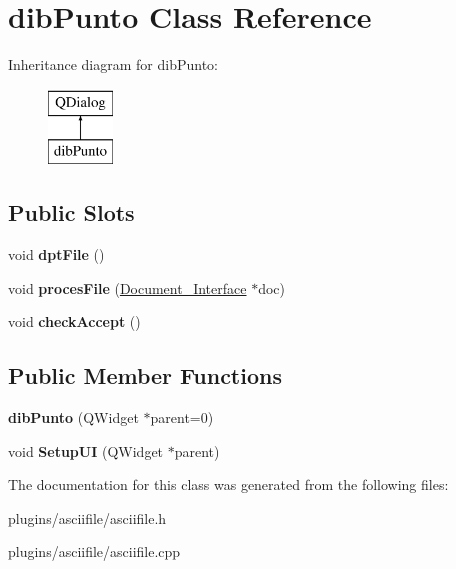 \hypertarget{classdibPunto}{\section{dib\-Punto Class Reference}
\label{classdibPunto}
}
Inheritance diagram for dib\-Punto\-:\begin{figure}[H]
\begin{center}
\leavevmode
\includegraphics[height=2.000000cm]{classdibPunto}
\end{center}
\end{figure}
\subsection*{Public Slots}
\begin{DoxyCompactItemize}
\item 
\hypertarget{classdibPunto_a6e71489566f40594877a9288651f0355}{void {\bfseries dpt\-File} ()}\label{classdibPunto_a6e71489566f40594877a9288651f0355}

\item 
\hypertarget{classdibPunto_a60b9d8212ec6cda0a5d0638f9c05ff74}{void {\bfseries proces\-File} (\hyperlink{classDocument__Interface}{Document\-\_\-\-Interface} $\ast$doc)}\label{classdibPunto_a60b9d8212ec6cda0a5d0638f9c05ff74}

\item 
\hypertarget{classdibPunto_a21f1670a1191b4a66c1383f6a97f72e4}{void {\bfseries check\-Accept} ()}\label{classdibPunto_a21f1670a1191b4a66c1383f6a97f72e4}

\end{DoxyCompactItemize}
\subsection*{Public Member Functions}
\begin{DoxyCompactItemize}
\item 
\hypertarget{classdibPunto_a5fe19976de37929b8c361ccd57b2fbe1}{{\bfseries dib\-Punto} (Q\-Widget $\ast$parent=0)}\label{classdibPunto_a5fe19976de37929b8c361ccd57b2fbe1}

\item 
\hypertarget{classdibPunto_a06d52729ab7c272b5119cf614b144f22}{void {\bfseries Setup\-U\-I} (Q\-Widget $\ast$parent)}\label{classdibPunto_a06d52729ab7c272b5119cf614b144f22}

\end{DoxyCompactItemize}


The documentation for this class was generated from the following files\-:\begin{DoxyCompactItemize}
\item 
plugins/asciifile/asciifile.\-h\item 
plugins/asciifile/asciifile.\-cpp\end{DoxyCompactItemize}
